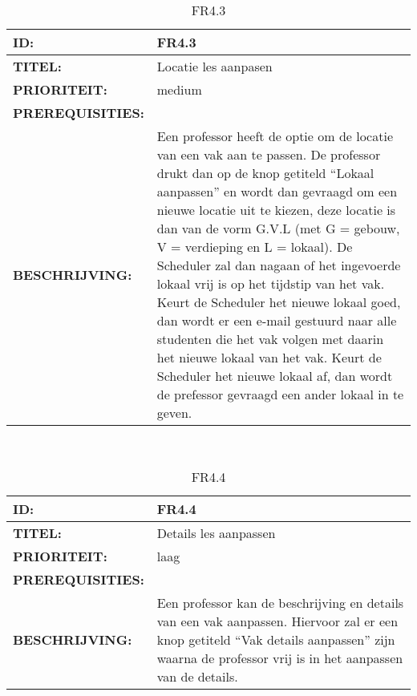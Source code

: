 \noindent\begin{table}[h]
            \begin{tabular}{l | p{10cm}}
                \textbf{ID:} & FR4.3 \\ \hline
                \textbf{TITEL:} & Locatie les aanpasen\\ \hline
                \textbf{PRIORITEIT:} &  medium \\ \hline
                \textbf{PREREQUISITIES:} & \\ \hline
                \textbf{BESCHRIJVING:} & Een professor heeft de optie om de locatie van een vak aan te passen. 
                                        De professor drukt dan op de knop getiteld “Lokaal aanpassen” en wordt dan gevraagd om een nieuwe locatie uit te kiezen, deze locatie is dan van de vorm G.V.L (met G = gebouw, V = verdieping en L = lokaal). De Scheduler zal dan nagaan of het ingevoerde lokaal vrij is op het tijdstip van het vak. Keurt de Scheduler het nieuwe lokaal goed, dan wordt er een e-mail gestuurd naar alle studenten die het vak volgen met daarin het nieuwe lokaal van het vak. Keurt de Scheduler het nieuwe lokaal af, dan wordt de prefessor gevraagd een ander lokaal in te geven.\\ 
            \end{tabular}\\
            \caption{FR4.3}
            \label{tab:FR4.3}
        \end{table}
        
\noindent\begin{table}[h]
            \begin{tabular}{l | p{10cm}}
                \textbf{ID:} & FR4.4 \\ \hline
                \textbf{TITEL:} & Details les aanpassen\\ \hline
                \textbf{PRIORITEIT:} &  laag \\ \hline
                \textbf{PREREQUISITIES:} & \\ \hline
                \textbf{BESCHRIJVING:} & Een professor kan de beschrijving en details van een vak aanpassen.                                              Hiervoor zal er een knop getiteld “Vak details aanpassen” zijn waarna de professor vrij is in het aanpassen van de details. \\ 
            \end{tabular}\\
            \caption{FR4.4}
            \label{tab:FR4.4}
        \end{table}
        
